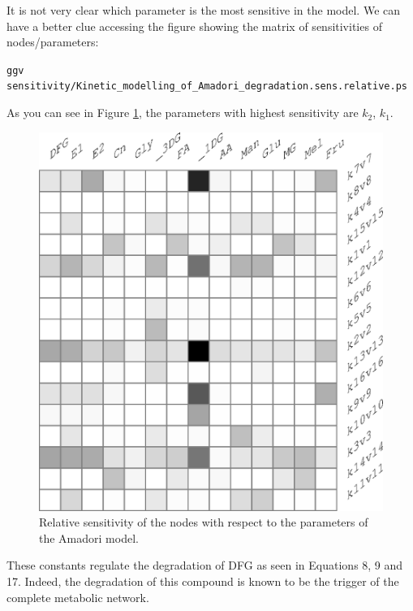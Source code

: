 \documentclass[a4paper, 11pt]{article}
\begin{document}
  It is not very clear which parameter is the most sensitive in the model.
  We can have a better clue accessing the figure showing the matrix of sensitivities of nodes/parameters:
  \begin{center}
    \footnotesize{\texttt{ggv sensitivity/Kinetic\_modelling\_of\_Amadori\_degradation.sens.relative.ps}}
  \end{center}
  As you can see in Figure \ref{amadoriSensitivityMatrix}, the parameters with highest sensitivity are $k_2$, $k_1$. 
  \begin{figure}[!h]
    \begin{center}
      \includegraphics[scale=.5]{figures/amadoriSensitivityMatrix.eps}
      \caption{Relative sensitivity of the nodes with respect to the parameters of the Amadori model.}\label{amadoriSensitivityMatrix}
    \end{center}
  \end{figure}
  These constants regulate the degradation of DFG as seen in Equations 8, 9 and 17.
  Indeed, the degradation of this compound is known to be the trigger of the complete metabolic network.
\end{document}
